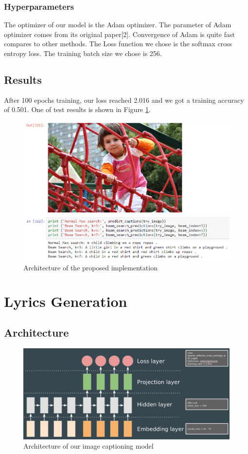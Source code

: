 \documentclass{article}
\begin{document}
\subsubsection{Hyperparameters}

The optimizer of our model is the Adam optimizer. The parameter of Adam optimizer comes from its original paper[2].  
Convergence of Adam is quite fast compares to other methods. The Loss function we chose is the softmax cross entropy loss. The training batch size we chose is 256. 

\subsection{Results}

After 100 epochs training, our loss reached 2.016 and we got a training accuracy of 0.501. One of test results is shown in Figure \ref{fig:3}. 

\begin{figure}[!ht]
\centering
\includegraphics[scale=0.65]{3.png}
\caption{Architecture of the proposed implementation}
\label{fig:3}
\end{figure}

\section{Lyrics Generation}
\label{sec:3}

\subsection{Architecture}
\begin{figure}[!ht]
\centering
\includegraphics[scale=0.2]{4.png}
\caption{Architecture of our image captioning model}
\label{fig:4}
\end{figure}
\end{document}
